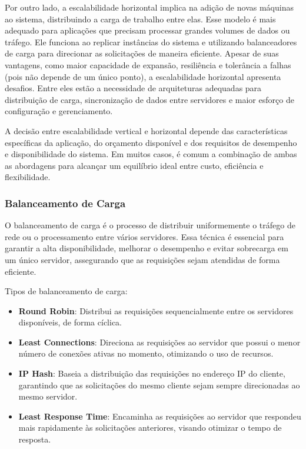Por outro lado, a escalabilidade horizontal implica na adição de novas máquinas ao sistema, distribuindo a carga de trabalho entre elas. Esse modelo é mais adequado para aplicações que precisam processar grandes volumes de dados ou tráfego. Ele funciona ao replicar instâncias do sistema e utilizando balanceadores de carga para direcionar as solicitações de maneira eficiente. Apesar de suas vantagens, como maior capacidade de expansão, resiliência e tolerância a falhas (pois não depende de um único ponto), a escalabilidade horizontal apresenta desafios. Entre eles estão a necessidade de arquiteturas adequadas para distribuição de carga, sincronização de dados entre servidores e maior esforço de configuração e gerenciamento.

A decisão entre escalabilidade vertical e horizontal depende das características específicas da aplicação, do orçamento disponível e dos requisitos de desempenho e disponibilidade do sistema. Em muitos casos, é comum a combinação de ambas as abordagens para alcançar um equilíbrio ideal entre custo, eficiência e flexibilidade.

\subsubsection{Balanceamento de Carga}


O balanceamento de carga é o processo de distribuir uniformemente o tráfego de rede ou o processamento entre vários servidores. Essa técnica é essencial para garantir a alta disponibilidade, melhorar o desempenho e evitar sobrecarga em um único servidor, assegurando que as requisições sejam atendidas de forma eficiente.

Tipos de balanceamento de carga:

\begin{itemize}
    \item \textbf{Round Robin}: Distribui as requisições sequencialmente entre os servidores disponíveis, de forma cíclica.
    \item \textbf{Least Connections}: Direciona as requisições ao servidor que possui o menor número de conexões ativas no momento, otimizando o uso de recursos.
    \item \textbf{IP Hash}: Baseia a distribuição das requisições no endereço IP do cliente, garantindo que as solicitações do mesmo cliente sejam sempre direcionadas ao mesmo servidor.
    \item \textbf{Least Response Time}: Encaminha as requisições ao servidor que respondeu mais rapidamente às solicitações anteriores, visando otimizar o tempo de resposta.
\end{itemize}


